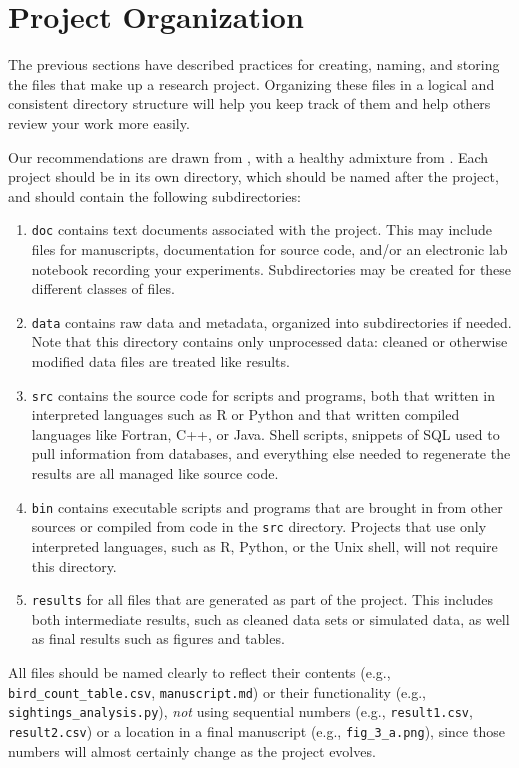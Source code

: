 \documentclass[10pt]{article}
\begin{document}
\section{Project Organization}\label{sec:project}

The previous sections have described practices for creating, naming,
and storing the files that make up a research project.  Organizing
these files in a logical and consistent directory structure will help
you keep track of them and help others review your work more easily.

Our recommendations are drawn from \cite{noble2009}, with a healthy
admixture from \cite{gentzkow2014}. Each project should be in its own
directory, which should be named after the project, and should contain
the following subdirectories:

\begin{enumerate}
\item
  \texttt{doc} contains text documents associated with the project. This
  may include files for manuscripts, documentation for source code,
  and/or an electronic lab notebook recording your experiments.
  Subdirectories may be created for these different classes of files.
\item
  \texttt{data} contains raw data and metadata, organized into
  subdirectories if needed. Note that this directory contains only
  unprocessed data: cleaned or otherwise modified data files are treated
  like results.
\item
  \texttt{src} contains the source code for scripts and programs, both
  that written in interpreted languages such as R or Python and that
  written compiled languages like Fortran, C++, or Java. Shell scripts,
  snippets of SQL used to pull information from databases, and
  everything else needed to regenerate the results are all managed like
  source code.
\item
  \texttt{bin} contains executable scripts and programs that are brought
  in from other sources or compiled from code in the \texttt{src}
  directory. Projects that use only interpreted languages, such as R,
  Python, or the Unix shell, will not require this directory.
\item
  \texttt{results} for all files that are generated as part of the
  project. This includes both intermediate results, such as cleaned data
  sets or simulated data, as well as final results such as figures and
  tables.
\end{enumerate}

All files should be named clearly to reflect their contents (e.g.,
\texttt{bird\_count\_table.csv}, \texttt{manuscript.md}) or their
functionality (e.g., \texttt{sightings\_analysis.py}), \emph{not} using
sequential numbers (e.g., \texttt{result1.csv}, \texttt{result2.csv}) or
a location in a final manuscript (e.g., \texttt{fig\_3\_a.png}), since
those numbers will almost certainly change as the project evolves.
\end{document}
